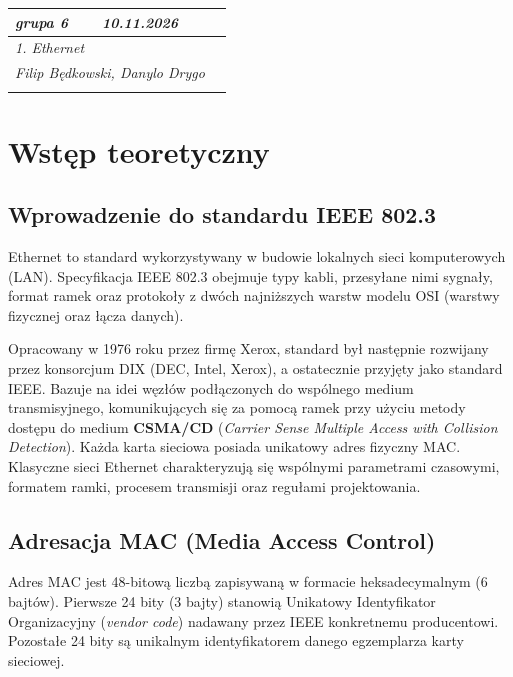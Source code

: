 \documentclass[11pt,a4paper]{article}
\begin{document}
\begin{table}[h!]
\centering
\renewcommand{\arraystretch}{1.5}
\begin{tabular}{|p{}|p{}|p{}|}
\hline
\textit{grupa 6} & \textit{10.11.2026} & \textit{} \\
\hline
\multicolumn{3}{|l|}{\textit{1. Ethernet}} \\
\hline
\multicolumn{2}{|l|}{\textit{Filip Będkowski, Danylo Drygo}} & \textit{} \\
\multicolumn{2}{|l|}{} & \\[1.5cm]
\hline
\end{tabular}
\end{table}

\vspace{0.5cm}

\section{Wstęp teoretyczny}

\subsection{Wprowadzenie do standardu IEEE 802.3}
Ethernet to standard wykorzystywany w budowie lokalnych sieci komputerowych (LAN). Specyfikacja IEEE 802.3 obejmuje typy kabli, przesyłane nimi sygnały, format ramek oraz protokoły z dwóch najniższych warstw modelu OSI (warstwy fizycznej oraz łącza danych). 

Opracowany w 1976 roku przez firmę Xerox, standard był następnie rozwijany przez konsorcjum DIX (DEC, Intel, Xerox), a ostatecznie przyjęty jako standard IEEE. Bazuje na idei węzłów podłączonych do wspólnego medium transmisyjnego, komunikujących się za pomocą ramek przy użyciu metody dostępu do medium \textbf{CSMA/CD} (\textit{Carrier Sense Multiple Access with Collision Detection}). Każda karta sieciowa posiada unikatowy adres fizyczny MAC. Klasyczne sieci Ethernet charakteryzują się wspólnymi parametrami czasowymi, formatem ramki, procesem transmisji oraz regułami projektowania.

\subsection{Adresacja MAC (Media Access Control)}
Adres MAC jest 48-bitową liczbą zapisywaną w formacie heksadecymalnym (6 bajtów). Pierwsze 24 bity (3 bajty) stanowią Unikatowy Identyfikator Organizacyjny (\textit{vendor code}) nadawany przez IEEE konkretnemu producentowi. Pozostałe 24 bity są unikalnym identyfikatorem danego egzemplarza karty sieciowej. 
\end{document}
